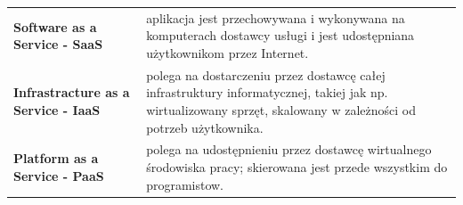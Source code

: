 \documentclass[a4paper]{article}
\begin{document}
    \begin{table}[H]
        \begin{center}
            \begin{tabular}{ p{.4\linewidth} p{.6\linewidth}}
                \textbf{Software as a Service - SaaS}
                &
                aplikacja jest przechowywana i wykonywana na
                komputerach dostawcy usługi i jest udostępniana
                użytkownikom przez Internet.
                \\

                \cmidrule(r){1-1}\cmidrule(l){2-2}
                \textbf{Infrastracture as a Service - IaaS}
                &
                polega na dostarczeniu przez dostawcę całej infrastruktury
                informatycznej, takiej jak np. wirtualizowany sprzęt,
                skalowany w zależności od potrzeb użytkownika.
                \\

                \cmidrule(r){1-1}\cmidrule(l){2-2}
                \textbf{Platform as a Service - PaaS}
                &
                polega na udostępnieniu przez dostawcę wirtualnego
                środowiska pracy; skierowana jest przede wszystkim do
                programistow.
                \\
            \end{tabular}
        \end{center}
    \end{table}
\end{document}
